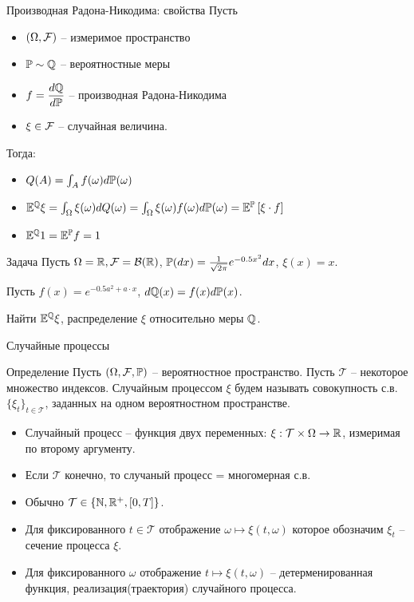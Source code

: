 \documentclass{beamer}
\begin{document}
\begin{frame}{Производная Радона-Никодима: свойства}
    Пусть 
    \begin{itemize} 
        \item $(\Omega, \mathcal{F})$ -- измеримое пространство
        \item $\mathbb{P} \sim \mathbb{Q}$ -- вероятностные меры
        \item $f=\dfrac{d\mathbb{Q}}{d\mathbb{P}}$ -- производная Радона-Никодима 
        \item $\xi \in \mathcal{F}$ -- случайная величина.
    \end{itemize}
    Тогда:
    \begin{itemize}
        \item $Q(A) = \int_{A} f(\omega) d\mathbb{P}(\omega)$
        \item $\mathbb{E}^{\mathbb{Q}} \xi = \int_{\Omega} \xi(\omega) dQ(\omega) = \int_{\Omega} \xi(\omega) f(\omega) d\mathbb{P}(\omega)
        = \mathbb{E}^{\mathbb{P}} \left[\xi \cdot f\right]$ 
        \item $\mathbb{E}^{\mathbb{Q}} 1 = \mathbb{E}^{\mathbb{P}} f = 1$
    \end{itemize}

    \begin{block}{Задача}
        Пусть $\Omega=\mathbb{R}, \mathcal{F} = \mathcal{B}(\mathbb{R})$, $\mathbb{P}(dx) = \frac{1}{\sqrt{2\pi}}e^{-0.5x^2}dx$, $\xi(x) = x$. 

        Пусть $f(x) = e^{-0.5 a^2+a\cdot x}$, $d\mathbb{Q}(x) = f(x)d\mathbb{P}(x)$. 
        
        Найти $\mathbb{E}^{\mathbb{Q}}\xi$, распределение $\xi$ относительно меры $\mathbb{Q}$.
    \end{block}
\end{frame}
\begin{frame}{Случайные процессы}
\begin{block}{Определение}
    Пусть $(\Omega, \mathcal{F}, \mathbb{P})$ -- вероятностное пространство. Пусть $\mathcal{T}$ -- некоторое множество индексов. Случайным процессом $\xi$ будем называть совокупность с.в. $\{\xi_t\}_{t\in \mathcal{T}}$, заданных на одном вероятностном пространстве.
\end{block}
\begin{itemize}
    \item Случайный процесс -- функция двух переменных: $\xi : \mathcal{T} \times \Omega \to \mathbb{R}$, измеримая по второму аргументу.
    \item Если $\mathcal{T}$ конечно, то случаный процесс = многомерная с.в.
    \item Обычно $\mathcal{T} \in \{ \mathbb{N}, \mathbb{R}^+, [0, T]\}$.
    \item Для фиксированного $t\in \mathcal{T}$ отображение 
    $\omega \mapsto\xi(t, \omega)$  которое обозначим $\xi_t$ -- сечение процесса $\xi$.
    \item Для фиксированного $\omega$ отображение $t \mapsto \xi(t, \omega)$ -- детерменированная функция, реализация(траектория) случайного процесса.
\end{itemize}
\end{frame}
\end{document}
